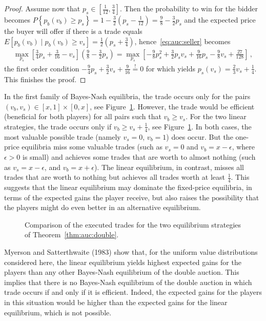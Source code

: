 \begin{proof}
Assume now that $p_s \in [\frac{1}{12},\frac{3}{4}]$.
Then the probability to win for the bidder becomes $P \left\{p_b(v_b) \geq p_s \right\} = 1 - \frac{3}{2}\left(p_s - \frac{1}{12} \right)=\frac{9}{8}- \frac{3}{2} p_s$ and the expected price the buyer will offer if there is a trade equals $E\left[p_b(v_b) \mid p_b(v_b) \geq v_s\right] = \frac{1}{2}\left(p_s + \frac{3}{4} \right)$, hence~\eqref{eq:auc:seller} becomes
\begin{align*}
 \max_{p_s} \left[\frac{3}{4}p_s + \frac{3}{16}  - v_s \right] \left(\frac{9}{8} - \frac{3}{2} p_s \right) =  \max_{p_s} \left[-\frac{9}{8} p_s^2 + \frac{3}{2} p_s v_s + \frac{9}{16} p_s - \frac{9}{8} v_s +  \frac{27}{128} \right]\,,
\end{align*}
the first order condition $-\frac{9}{4} p_s + \frac{3}{2} v_s + \frac{9}{16} \stackrel{!}{=} 0$ for which yields $p_s(v_s) = \frac{2}{3} v_s + \frac{1}{4}$. This finishes the proof.
\end{proof}

In the first family of Bayes-Nash equilibria, the trade occurs only for the pairs $(v_b,v_s) \in [x,1] \times [0,x]$, see Figure~\ref{fig:auc:trade}. However, the trade would be efficient (beneficial for both players) for all pairs such that $v_b \geq v_s$. For the two linear strategies, the trade occurs only if $v_b \geq v_s + \frac{1}{4}$, see Figure~\ref{fig:auc:trade}.
In both cases, the most valuable possible trade (namely $v_s = 0$, $v_b = 1$) does occur. But the one-price equilibria miss some valuable trades (such as $v_s = 0$ and $v_b = x-\epsilon$, where $\epsilon > 0$ is small) and achieves some trades that are worth to almost nothing (such as $v_s = x- \epsilon$, and $v_b = x + \epsilon$). The linear equilibrium, in contrast, misses all trades that are worth to nothing but achieves all trades worth at least $\frac{1}{4}$. This suggests that the linear equilibrium may dominate the fixed-price equilibria, in terms of the expected gains the player receive, but also raises the possibility that the players might do even better in an alternative equilibrium.

\begin{figure}[h!t]
\hfill  \hfill\null
\caption{Comparison of the executed trades for the two equilibrium strategies of Theorem~\ref{thm:auc:double}.}
\label{fig:auc:trade}
\end{figure}

Myerson and Satterthwaite (1983) show that, for the uniform value distributions considered here, the linear equilibrium yields highest expected gains for the players than any other Bayes-Nash equilibrium of the double auction. This implies that there is no Bayes-Nash equilibrium of the double auction in which trade occurs if and only if it is efficient. Indeed, the expected gains for the players in this situation would be higher than the expected gains for the linear equilibrium, which is not possible.



\ifx \globalmark \undefined %


	
\else

\fi
